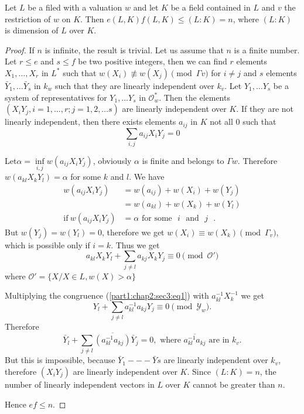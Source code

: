 \begin{proposition}\label{part1:chap2:sec3:prop2}%
  Let $L$ be a filed with a valuation $w$ and let $K$ be a field
  contained in $L$ and $v$ the restriction of $w$ on $K$. 
  Then $e(L, K) f(L, K)\leq (L:  K) =n$, where $(L:  K)$ is dimension
  of $L$ over $K$. 
\end{proposition}

\begin{proof}
  If $n$ is infinite, the result is trivial. Let us assume that $n$ is
  a finite number. Let $r \leq e$ and $s \leq f$ be two positive
  integers, then we can find $r$ elements $X_1, \ldots,  X_r$ in
  $L^\ast$ such that $w(X_i) \not\equiv w(X_j) \pmod {\Gamma v}$ for $i
  \neq j$ and $s$ elements $\bar{Y}_1, \ldots \bar{Y}_s$ in $k_w$ such
  that they are linearly independent over $k_v$. Let $Y_1, \ldots Y_s$
  be a system of representatives for $Y_1, \ldots Y_s$ in
  $\mathscr{O}^\ast_w$. Then the elements $(X_i Y_j, i=1, \ldots, r ;
  j=1, 2, \ldots s)$ are linearly independent over $K$. If they are
  not linearly independent, then there exists elements $a_{ij}$ in
  $K$ not all $0$ such that 
  $$
  \sum_{i, j}  a_{ij}  X_i  Y_j  = 0
  $$

  Let\pageoriginale $\alpha = \inf\limits_{i, j} w (a_{ij} X_i Y_j)$, obviously
  $\alpha$ is finite and belongs to $\Gamma w$. Therefore $w(a_{kl} X_k
  Y_l) = \alpha $ for some $k$ and $l$. We have 
  \begin{align*}
    w(a_{ij} X_i Y_j) & = w (a_{ij}) + w(X_i) + w(Y_j)\\
    & = w (a_{kl}) + w(X_k) + w(Y_l)\\
    \text{if}~ w(a_{ij } X_i Y_j) & = \alpha \text{ for some~ $i$ ~and~ $j$ }.
  \end{align*}
  But $w(Y_j) = w(Y_l) = 0$, therefore we get $w(X_i) \equiv w(X_k)
  \pmod {\Gamma_v}$, which is possible only if $i = k$. Thus we get 
  \begin{equation*}
    a_{kl} X_k Y_l + \sum\limits_{j \neq l} a_{kj} X_k Y_j \equiv 0
    \pmod {\mathscr{O}'} \tag{1}\label{part1:chap2:sec3:eq1}
  \end{equation*}
  where $\mathscr{O}' = \{X / X \in L, w(X) > \alpha \}$
  
  Multiplying the congruence (\ref{part1:chap2:sec3:eq1}) with
  $a^{-1}_{kl} X^{-1}_{k}$ we get 
  $$
  Y_l + \sum_{j \neq l} a^{-1}_{kl} a_{kj} Y_j \equiv 0 \pmod {\mathscr{Y}_w}.
  $$
  Therefore 
  $$
  \bar{Y}_l + \sum_{j \neq l} \overline{(a^{-1}_{kl}a_{kj})} \bar{Y}_j =
  0, \text { where } \overline{a^{-1}_{kl} a_{kj}} \text { are in }
  k_v. 
  $$
  But this is impossible, because $\bar{Y}_1 - - - \bar{Y}s$ are
  linearly independent over $k_v$, therefore $(X_i Y_j)$ are linearly
  independent over $K$. Since $(L:  K ) = n$, the number of linearly
  independent vectors in $L$ over $K$ cannot be greater than $n$. 
  
  Hence $e f \leq n$.
\end{proof}

